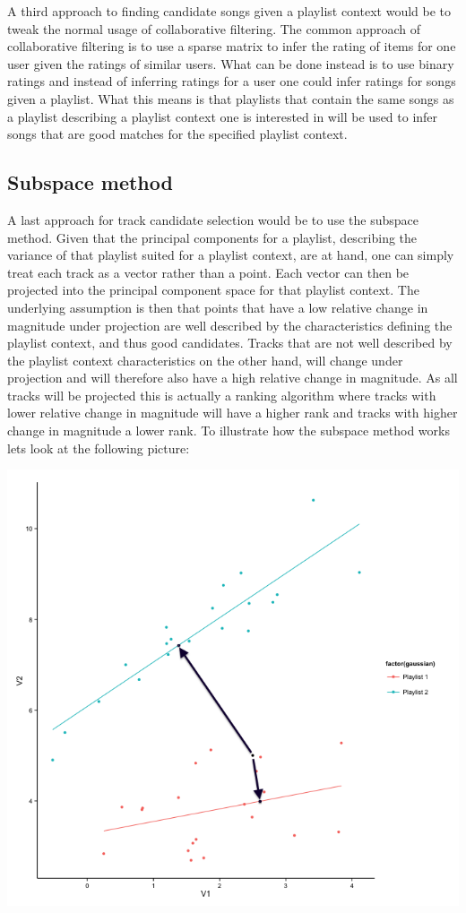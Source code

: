 \documentclass[a4paper,11pt]{kth-mag}
\begin{document}
A third approach to finding candidate songs given a playlist context would be to tweak the normal usage of collaborative filtering. The common approach of collaborative filtering is to use a sparse matrix to infer the rating of items for one user given the ratings of similar users. What can be done instead is to use binary ratings and instead of inferring ratings for a user one could infer ratings for songs given a playlist. What this means is that playlists that contain the same songs as a playlist describing a playlist context one is interested in will be used to infer songs that are good matches for the specified playlist context. 

\subsection{Subspace method}
A last approach for track candidate selection would be to use the subspace method. Given that the principal components for a playlist, describing the variance of that playlist suited for a playlist context, are at hand, one can simply treat each track as a vector rather than a point. Each vector can then be projected into the principal component space for that playlist context. The underlying assumption is then that points that have a low relative change in magnitude under projection are well described by the characteristics defining the playlist context, and thus good candidates. Tracks that are not well described by the playlist context characteristics on the other hand, will change under projection and will therefore also have a high relative change in magnitude. As all tracks will be projected this is actually a ranking algorithm where tracks with lower relative change in magnitude will have a higher rank and tracks with higher change in magnitude a lower rank. To illustrate how the subspace method works lets look at the following picture:

\includegraphics[scale=0.6]{images/subspaceIllustrationBW0.png}
\end{document}
